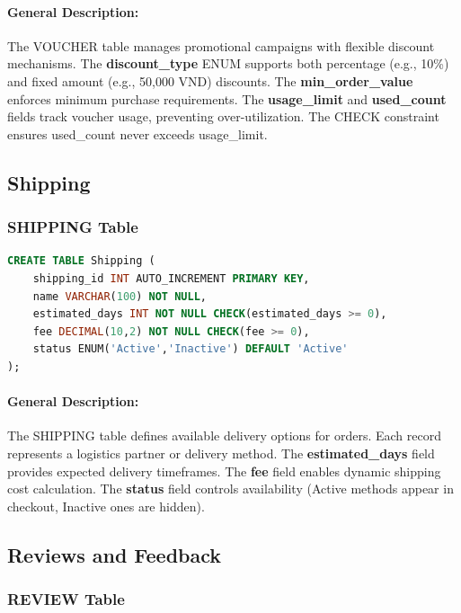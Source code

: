 \paragraph{General Description:}
The VOUCHER table manages promotional campaigns with flexible discount mechanisms. The \textbf{discount\_type} ENUM supports both percentage (e.g., 10\%) and fixed amount (e.g., 50,000 VND) discounts. The \textbf{min\_order\_value} enforces minimum purchase requirements. The \textbf{usage\_limit} and \textbf{used\_count} fields track voucher usage, preventing over-utilization. The CHECK constraint ensures used\_count never exceeds usage\_limit.

\subsection{Shipping}
\subsubsection{SHIPPING Table}

\begin{lstlisting}[language=SQL, caption=SHIPPING Table Creation, label=lst:shipping]
CREATE TABLE Shipping (
    shipping_id INT AUTO_INCREMENT PRIMARY KEY,
    name VARCHAR(100) NOT NULL,
    estimated_days INT NOT NULL CHECK(estimated_days >= 0),
    fee DECIMAL(10,2) NOT NULL CHECK(fee >= 0),
    status ENUM('Active','Inactive') DEFAULT 'Active'
);
\end{lstlisting}

\paragraph{General Description:}
The SHIPPING table defines available delivery options for orders. Each record represents a logistics partner or delivery method. The \textbf{estimated\_days} field provides expected delivery timeframes. The \textbf{fee} field enables dynamic shipping cost calculation. The \textbf{status} field controls availability (Active methods appear in checkout, Inactive ones are hidden).

\subsection{Reviews and Feedback}
\subsubsection{REVIEW Table}


